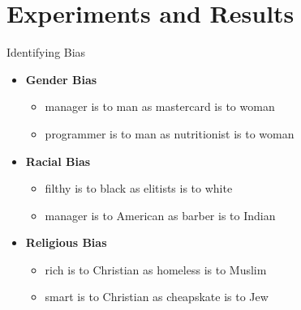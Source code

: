 \documentclass{beamer}
\begin{document}
	
	\section{Experiments and Results}
	\begin{frame}{Identifying Bias}
		\begin{itemize}
			\item \textbf{Gender Bias}
			\begin{itemize}
				\item manager is to man as mastercard is to woman
				\item programmer is to man as nutritionist is to woman
			\end{itemize}
			\item \textbf{Racial Bias}
			\begin{itemize}
				\item filthy is to black as elitists is to white
				\item manager is to American as barber is to Indian
			\end{itemize}
			\item \textbf{Religious Bias}
			\begin{itemize}
				\item rich is to Christian as homeless is to Muslim
				\item smart is to Christian as cheapskate is to Jew
			\end{itemize}
		\end{itemize}
	\end{frame}
	
\end{document}

